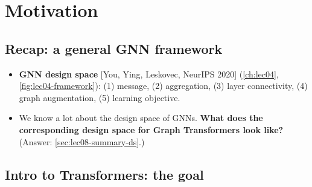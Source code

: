 \section{Motivation}\label{sec:lec08-intro}

\subsection{Recap: a general GNN framework}\label{sec:lec08-recap}

\begin{itemize}
  \item \textbf{GNN design space} [You, Ying, Leskovec, NeurIPS 2020]
    (\cref{ch:lec04}, \cref{fig:lec04-framework}): (1) message, (2) aggregation,
    (3) layer connectivity, (4) graph augmentation, (5) learning objective.
  \item We know a lot about the design space of GNNs. \textbf{What does the
    corresponding design space for Graph Transformers look like?} (Answer:
    \cref{sec:lec08-summary-ds}.)
\end{itemize}

\subsection{Intro to Transformers: the goal}\label{sec:lec08-goal}

